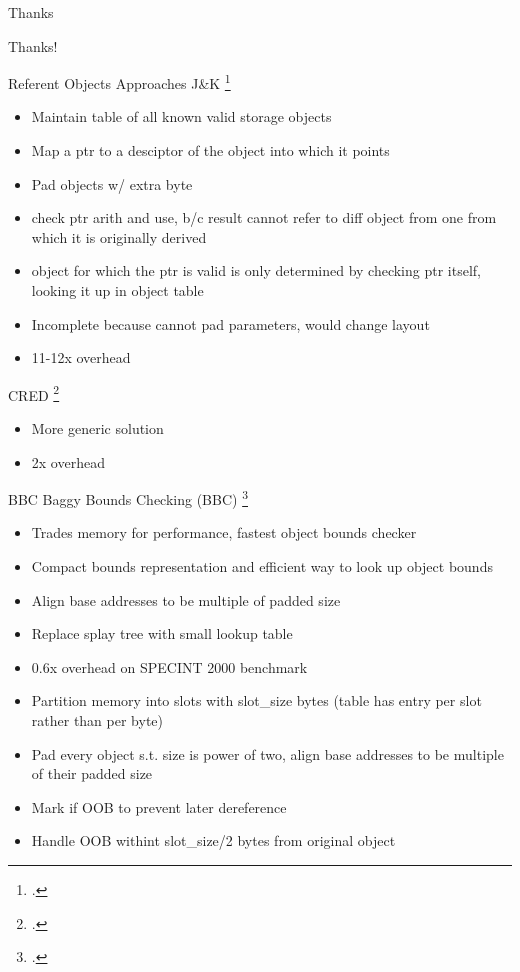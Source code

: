 \documentclass[aspectratio=169]{beamer}
\begin{document}
\begin{frame}{Thanks}
    \begin{center}
        \Huge{Thanks!}
    \end{center}
\end{frame}

\appendix

\begin{frame}{Referent Objects Approaches}
\footnotesize
J\&K \footcite{jones_backwards-compatible_1997}
    \begin{itemize}
       \item Maintain table of all known valid storage objects
       \item Map a ptr to a desciptor of the object into which it points
       \item Pad objects w/ extra byte
       \item check ptr arith and use, b/c result cannot refer to diff object from one from which it is originally derived
       \item object for which the ptr is valid is only determined by checking ptr itself, looking it up in object table
       \item Incomplete because cannot pad parameters, would change layout
       \item 11-12x overhead
    \end{itemize}

CRED \footcite{ruwase_practical_2004}
    \begin{itemize}
      \item More generic solution
      \item 2x overhead
    \end{itemize}
\vspace{0.2in}
\end{frame}

\begin{frame}{BBC}
\footnotesize
Baggy Bounds Checking (BBC) \footcite{akritidis_baggy_2009}
    \begin{itemize}
    \item Trades memory for performance, fastest object bounds checker
    \item Compact bounds representation and efficient way to look up object bounds
    \item Align base addresses to be multiple of padded size
    \item Replace splay tree with small lookup table
    \item 0.6x overhead on SPECINT 2000 benchmark
    \item Partition memory into slots with slot\_size bytes (table has entry per slot rather than per byte)
    \item Pad every object s.t. size is power of two, align base addresses to be multiple of their padded size
    \item Mark if OOB to prevent later dereference
    \item Handle OOB withint slot\_size/2 bytes from original object
    \end{itemize}
\vspace{0.2in}
\end{frame}
\end{document}
